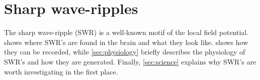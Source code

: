 \chapter{Sharp wave-ripples}
\label{ch:SWR}

The sharp wave-ripple (SWR) is a well-known motif of the local field potential.  shows where SWR's are found in the brain and what they look like.  shows how they can be recorded, while \cref{sec:physiology} briefly describes the physiology of SWR's and how they are generated. Finally, \cref{sec:science} explains why SWR's are worth investigating in the first place.





